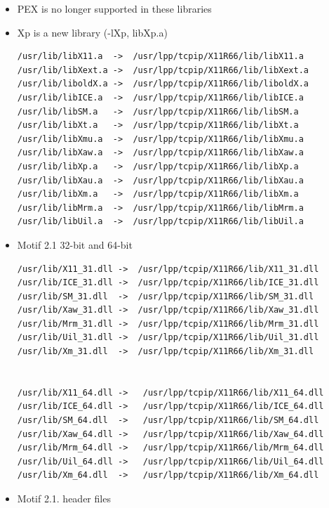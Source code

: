 \begin{itemize}
  \item PEX is no longer supported in these libraries
  \item Xp is a new library (-lXp, libXp.a)

\begin{verbatim}
/usr/lib/libX11.a  ->  /usr/lpp/tcpip/X11R66/lib/libX11.a 
/usr/lib/libXext.a ->  /usr/lpp/tcpip/X11R66/lib/libXext.a 
/usr/lib/liboldX.a ->  /usr/lpp/tcpip/X11R66/lib/liboldX.a 
/usr/lib/libICE.a  ->  /usr/lpp/tcpip/X11R66/lib/libICE.a 
/usr/lib/libSM.a   ->  /usr/lpp/tcpip/X11R66/lib/libSM.a 
/usr/lib/libXt.a   ->  /usr/lpp/tcpip/X11R66/lib/libXt.a 
/usr/lib/libXmu.a  ->  /usr/lpp/tcpip/X11R66/lib/libXmu.a 
/usr/lib/libXaw.a  ->  /usr/lpp/tcpip/X11R66/lib/libXaw.a 
/usr/lib/libXp.a   ->  /usr/lpp/tcpip/X11R66/lib/libXp.a 
/usr/lib/libXau.a  ->  /usr/lpp/tcpip/X11R66/lib/libXau.a 
/usr/lib/libXm.a   ->  /usr/lpp/tcpip/X11R66/lib/libXm.a 
/usr/lib/libMrm.a  ->  /usr/lpp/tcpip/X11R66/lib/libMrm.a 
/usr/lib/libUil.a  ->  /usr/lpp/tcpip/X11R66/lib/libUil.a 
\end{verbatim}

  \item Motif 2.1  32-bit and 64-bit
  
\begin{verbatim}
/usr/lib/X11_31.dll ->  /usr/lpp/tcpip/X11R66/lib/X11_31.dll 
/usr/lib/ICE_31.dll ->  /usr/lpp/tcpip/X11R66/lib/ICE_31.dll 
/usr/lib/SM_31.dll  ->  /usr/lpp/tcpip/X11R66/lib/SM_31.dll 
/usr/lib/Xaw_31.dll ->  /usr/lpp/tcpip/X11R66/lib/Xaw_31.dll 
/usr/lib/Mrm_31.dll ->  /usr/lpp/tcpip/X11R66/lib/Mrm_31.dll
/usr/lib/Uil_31.dll ->  /usr/lpp/tcpip/X11R66/lib/Uil_31.dll
/usr/lib/Xm_31.dll  ->  /usr/lpp/tcpip/X11R66/lib/Xm_31.dll 


/usr/lib/X11_64.dll ->   /usr/lpp/tcpip/X11R66/lib/X11_64.dll 
/usr/lib/ICE_64.dll ->   /usr/lpp/tcpip/X11R66/lib/ICE_64.dll 
/usr/lib/SM_64.dll  ->   /usr/lpp/tcpip/X11R66/lib/SM_64.dll 
/usr/lib/Xaw_64.dll ->   /usr/lpp/tcpip/X11R66/lib/Xaw_64.dll 
/usr/lib/Mrm_64.dll ->   /usr/lpp/tcpip/X11R66/lib/Mrm_64.dll
/usr/lib/Uil_64.dll ->   /usr/lpp/tcpip/X11R66/lib/Uil_64.dll
/usr/lib/Xm_64.dll  ->   /usr/lpp/tcpip/X11R66/lib/Xm_64.dll 
\end{verbatim}

  \item Motif 2.1. header files
  

\end{itemize}
